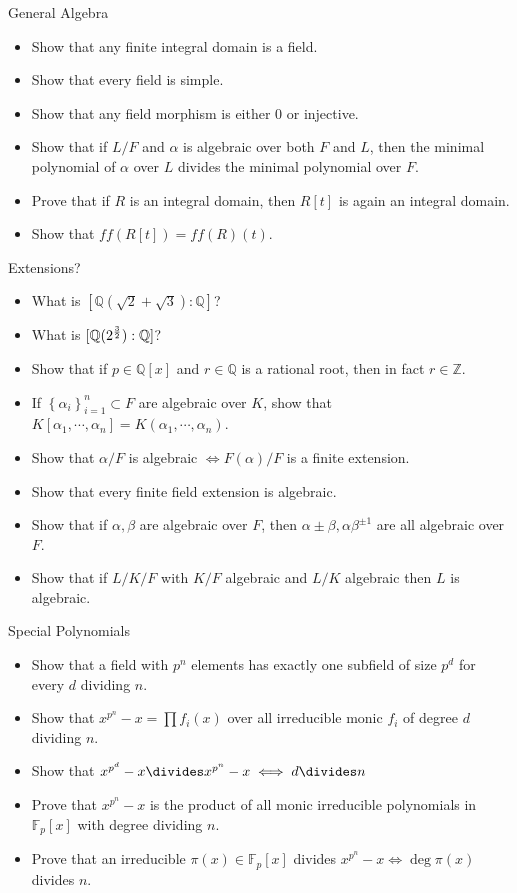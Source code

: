 General Algebra

\begin{itemize}
\tightlist
\item
  Show that any finite integral domain is a field.
\item
  Show that every field is simple.
\item
  Show that any field morphism is either 0 or injective.
\item
  Show that if \(L/F\) and \(\alpha\) is algebraic over both \(F\) and
  \(L\), then the minimal polynomial of \(\alpha\) over \(L\) divides
  the minimal polynomial over \(F\).
\item
  Prove that if \(R\) is an integral domain, then \(R[t]\) is again an
  integral domain.
\item
  Show that \(ff(R[t]) = ff(R)(t)\).
\end{itemize}

Extensions?

\begin{itemize}
\tightlist
\item
  What is \([{\mathbb{Q}}(\sqrt 2 + \sqrt 3): {\mathbb{Q}}]\)?
\item
  What is \([{\mathbb{Q}}(2^{3\over 2}) : {\mathbb{Q}}]\)?
\item
  Show that if \(p\in {\mathbb{Q}}[x]\) and \(r\in {\mathbb{Q}}\) is a
  rational root, then in fact \(r\in {\mathbb{Z}}\).
\item
  If \(\left\{{\alpha_i}\right\}_{i=1}^n \subset F\) are algebraic over
  \(K\), show that
  \(K[\alpha_1, \cdots, \alpha_n] = K(\alpha_1, \cdots, \alpha_n)\).
\item
  Show that \(\alpha/F\) is algebraic \(\iff F(\alpha)/F\) is a finite
  extension.
\item
  Show that every finite field extension is algebraic.
\item
  Show that if \(\alpha, \beta\) are algebraic over \(F\), then
  \(\alpha\pm \beta, \alpha\beta^{\pm 1}\) are all algebraic over \(F\).
\item
  Show that if \(L/K/F\) with \(K/F\) algebraic and \(L/K\) algebraic
  then \(L\) is algebraic.
\end{itemize}

Special Polynomials

\begin{itemize}
\tightlist
\item
  Show that a field with \(p^n\) elements has exactly one subfield of
  size \(p^d\) for every \(d\) dividing \(n\).
\item
  Show that \(x^{p^n} - x = \prod f_i(x)\) over all irreducible monic
  \(f_i\) of degree \(d\) dividing \(n\).
\item
  Show that \(x^{p^d} - x \divides x^{p^n} - x \iff d \divides n\)
\item
  Prove that \(x^{p^n}-x\) is the product of all monic irreducible
  polynomials in \({\mathbb{F}}_p[x]\) with degree dividing \(n\).
\item
  Prove that an irreducible \(\pi(x)\in {\mathbb{F}}_p[x]\) divides
  \(x^{p^n}-x \iff \deg \pi(x)\) divides \(n\).
\end{itemize}

